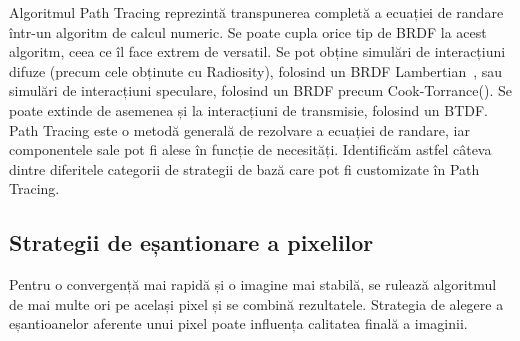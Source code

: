 \documentclass[12pt,a4paper]{report}
\numberwithin{equation}{section} %
\begin{document}
Algoritmul Path Tracing reprezintă transpunerea completă a ecuației de randare
într-un algoritm de calcul numeric. Se poate cupla orice tip de BRDF la acest
algoritm, ceea ce îl face extrem de versatil. Se pot obține simulări de interacțiuni
difuze (precum cele obținute cu Radiosity), folosind un BRDF Lambertian~\cite{Lambert}, sau
simulări de interacțiuni speculare, folosind un BRDF precum Cook-Torrance(\cite{CookTorrance}).
Se poate extinde de asemenea și la interacțiuni de transmisie, folosind un BTDF.
Path Tracing este o metodă generală de rezolvare a ecuației de randare, iar componentele
sale pot fi alese în funcție de necesități. Identificăm astfel câteva dintre diferitele
categorii de strategii de bază care pot fi customizate în Path Tracing.

\subsection{Strategii de eșantionare a pixelilor}

Pentru o convergență mai rapidă și o imagine mai stabilă, se rulează algoritmul
de mai multe ori pe același pixel și se combină rezultatele. Strategia de alegere
a eșantioanelor aferente unui pixel poate influența calitatea finală a imaginii.
\end{document}
